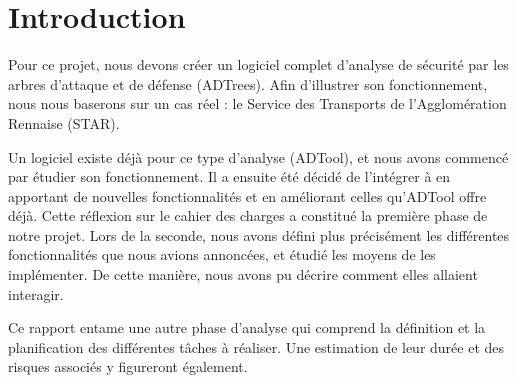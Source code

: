 \section{Introduction}
	\label{sec:intro}





	Pour ce projet, nous devons créer un logiciel complet d'analyse de sécurité par les arbres d'attaque et de défense (ADTrees). Afin d'illustrer son fonctionnement, nous nous baserons sur un cas réel : le Service des Transports de l'Agglomération Rennaise (STAR).

	Un logiciel existe déjà pour ce type d'analyse (ADTool), et nous avons commencé par étudier son fonctionnement. Il a ensuite été décidé de l'intégrer à \glasir{} en apportant de nouvelles fonctionnalités et en améliorant celles qu'ADTool offre déjà. Cette réflexion sur le cahier des charges a constitué la première phase de notre projet. Lors de la seconde, nous avons défini plus précisément les différentes fonctionnalités que nous avions annoncées, et étudié les moyens de les implémenter. De cette manière, nous avons pu décrire comment elles allaient interagir.

	Ce rapport entame une autre phase d'analyse qui comprend la définition et la planification des différentes tâches à réaliser. Une estimation de leur durée et des risques associés y figureront également.